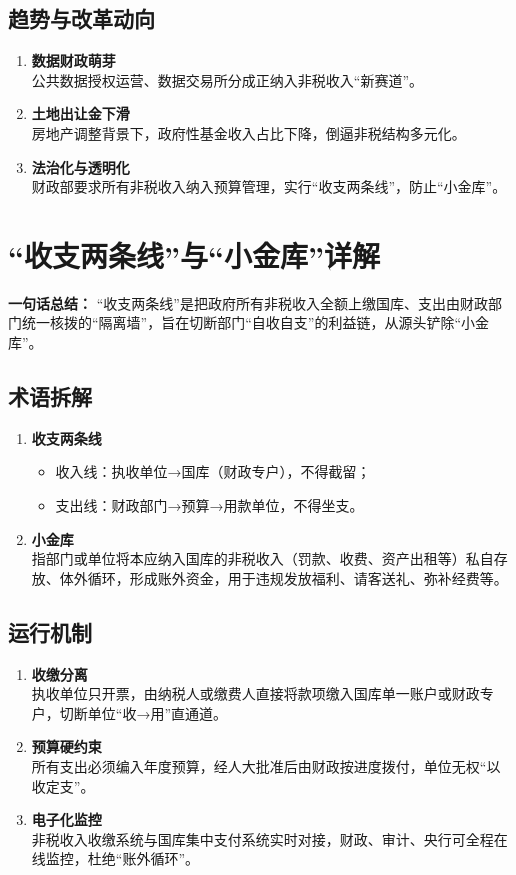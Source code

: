 \subsection{趋势与改革动向}
\begin{enumerate}[leftmargin=*, nosep]
    \item \textbf{数据财政萌芽}  \\
    {\color{red}公共数据授权运营、数据交易所分成正纳入非税收入“新赛道”。}
    \item \textbf{土地出让金下滑}  \\
    房地产调整背景下，政府性基金收入占比下降，倒逼非税结构多元化。
    \item \textbf{法治化与透明化}  \\
    {\color{red}财政部要求所有非税收入纳入预算管理，实行“收支两条线”，防止“小金库”。}
\end{enumerate}

\section{“收支两条线”与“小金库”详解}
\textbf{一句话总结：}  
{\color{red}“收支两条线”是把政府所有非税收入全额上缴国库、支出由财政部门统一核拨的“隔离墙”，旨在切断部门“自收自支”的利益链，从源头铲除“小金库”。}

\subsection{术语拆解}
\begin{enumerate}[leftmargin=*, nosep]
    \item \textbf{收支两条线}  
    \begin{itemize}[nosep]
        \item 收入线：执收单位→国库（财政专户），不得截留；  
        \item 支出线：财政部门→预算→用款单位，不得坐支。
    \end{itemize}
    \item \textbf{小金库}  \\
    指部门或单位将本应纳入国库的非税收入（罚款、收费、资产出租等）私自存放、体外循环，形成账外资金，用于违规发放福利、请客送礼、弥补经费等。
\end{enumerate}

\subsection{运行机制}
\begin{enumerate}[leftmargin=*, nosep]
    \item \textbf{收缴分离}  \\
    执收单位只开票，由纳税人或缴费人直接将款项缴入国库单一账户或财政专户，切断单位“收→用”直通道。
    \item \textbf{预算硬约束}  \\
    所有支出必须编入年度预算，经人大批准后由财政按进度拨付，单位无权“以收定支”。
    \item \textbf{电子化监控}  \\
    非税收入收缴系统与国库集中支付系统实时对接，财政、审计、央行可全程在线监控，杜绝“账外循环”。
\end{enumerate}

